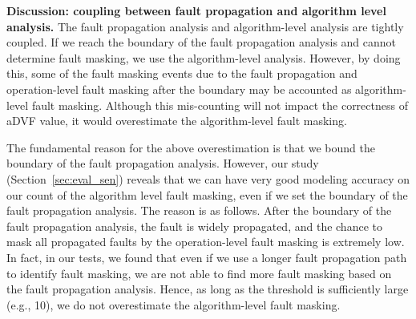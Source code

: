 \textbf{Discussion: coupling between fault propagation and algorithm level analysis.}
The fault propagation analysis and algorithm-level analysis are tightly coupled.
If we reach the boundary of the fault propagation analysis and cannot determine fault masking, we use the algorithm-level analysis. %
However, by doing this, 
some of the fault masking events due to the fault propagation and operation-level fault masking after the boundary may be accounted as algorithm-level fault masking.
Although this mis-counting will not impact the correctness of aDVF value, it would overestimate the algorithm-level fault masking.
\begin{comment}
However, the application execution deemed to be correct at the end of the execution 
may be a result of both the algorithm-level fault masking and the fault propagation-based fault masking.
We cannot count those fault propagation-based fault masking, because we set an upper bound on the number of operations 
for the fault propagation analysis.
Simply speaking, we may lose accuracy trading for simplification of the fault propagation analysis.
\end{comment}

The fundamental reason for the above overestimation is that we bound the boundary of the fault propagation analysis.
However, our study (Section~\ref{sec:eval_sen}) reveals that we can have very good modeling
accuracy on our count of the algorithm level fault masking,
even if we set the boundary of the fault propagation analysis.
The reason is as follows. %
After the boundary of the fault propagation analysis, the fault is widely propagated, and
the chance to mask all propagated faults by the operation-level fault masking is extremely low.
In fact, in our tests, we found that even if we use a longer fault propagation path to identify fault masking, we are not able to find more fault masking based on the fault propagation analysis.
Hence, as long as the threshold is sufficiently large (e.g., 10), 
we do not overestimate the algorithm-level fault masking. %
\vspace{-10pt}